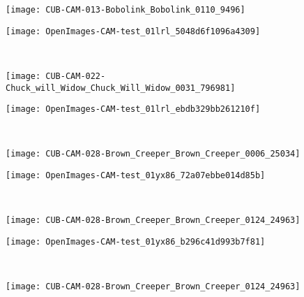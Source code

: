 \documentclass[twocolumn]{article}
\theoremstyle{definition}
\begin{document}
\begin{figure*}
\begin{subfigure}[b]{0.49\textwidth}
         \centering
         \texttt{[image: CUB-CAM-013-Bobolink\_Bobolink\_0110\_9496]}
     \end{subfigure}
     \hfill
     \begin{subfigure}[b]{0.49\textwidth}
         \centering
         \texttt{[image: OpenImages-CAM-test\_01lrl\_5048d6f1096a4309]}
     \end{subfigure}
     \\
     \vspace{0.1cm}
     \begin{subfigure}[b]{0.49\textwidth}
         \centering
         \texttt{[image: CUB-CAM-022-Chuck\_will\_Widow\_Chuck\_Will\_Widow\_0031\_796981]}
     \end{subfigure}
     \hfill
     \begin{subfigure}[b]{0.49\textwidth}
         \centering
         \texttt{[image: OpenImages-CAM-test\_01lrl\_ebdb329bb261210f]}
     \end{subfigure}
      \\
     \vspace{0.1cm}
     \begin{subfigure}[b]{0.49\textwidth}
         \centering
         \texttt{[image: CUB-CAM-028-Brown\_Creeper\_Brown\_Creeper\_0006\_25034]}
     \end{subfigure}
     \hfill
     \begin{subfigure}[b]{0.49\textwidth}
         \centering
         \texttt{[image: OpenImages-CAM-test\_01yx86\_72a07ebbe014d85b]}
     \end{subfigure}
      \\
     \vspace{0.1cm}
     \begin{subfigure}[b]{0.49\textwidth}
         \centering
         \texttt{[image: CUB-CAM-028-Brown\_Creeper\_Brown\_Creeper\_0124\_24963]}
     \end{subfigure}
     \hfill
     \begin{subfigure}[b]{0.49\textwidth}
         \centering
         \texttt{[image: OpenImages-CAM-test\_01yx86\_b296c41d993b7f81]}
     \end{subfigure}
      \\
     \vspace{0.1cm}
     \begin{subfigure}[b]{0.49\textwidth}
         \centering
         \texttt{[image: CUB-CAM-028-Brown\_Creeper\_Brown\_Creeper\_0124\_24963]}
     \end{subfigure}

\end{figure*}
\end{document}
